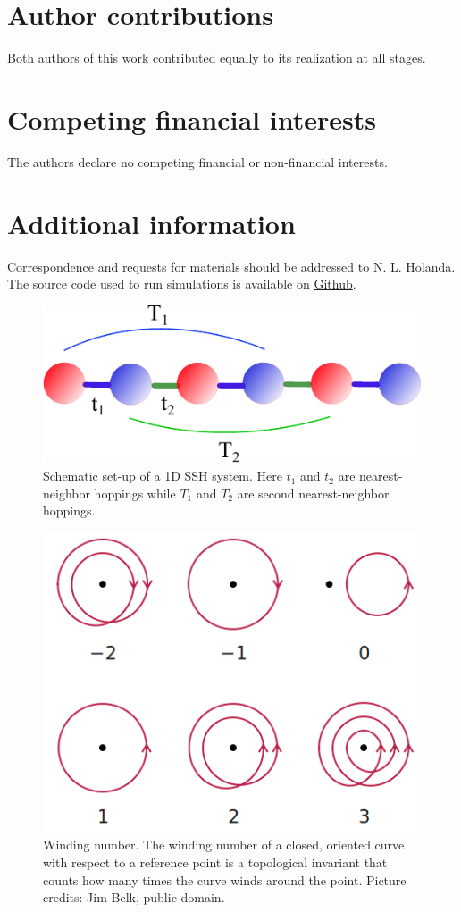 \documentclass[10pt]{revtex4-1}
\begin{document}
\section*{Author contributions}

Both authors of this work contributed equally to its realization at all stages.

\section*{Competing financial interests}

The authors declare no competing financial or non-financial interests.

\section*{Additional information}

Correspondence and requests for materials should be addressed to N. L. Holanda. The source code used to run simulations is available on \href{https://github.com/linneuholanda/ml_topological_phases_in_real_space}{Github}.




\newpage

\begin{figure}
  \centering
  \includegraphics[width=.37\textwidth]{./phase_diagrams/ssh_model.pdf}
  \caption{Schematic set-up of a 1D SSH system. Here $t_1$ and $t_2$ are nearest-neighbor hoppings while $T_1$ and $T_2$ are second nearest-neighbor hoppings.}
\label{fig:model}
\end{figure}

\begin{figure}%
  \centering
  \includegraphics[width=.37\textwidth]{./phase_diagrams/winding.png}
  \caption{Winding number. The winding number of a closed, oriented curve with respect to a reference point is a topological invariant that counts how many times the curve winds around the point. Picture credits: Jim Belk, public domain.}
\label{fig:winding}
\end{figure}
\end{document}
